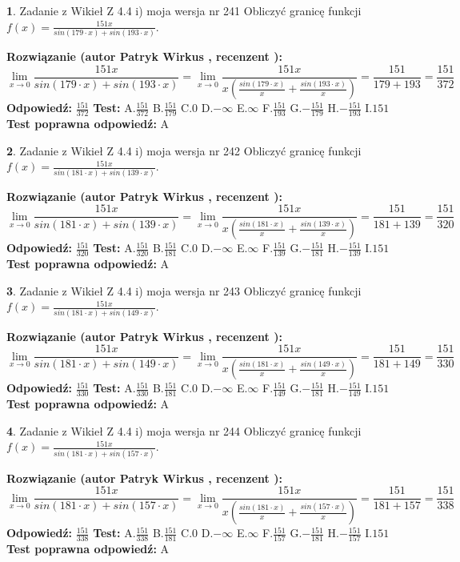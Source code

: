 \documentclass[12pt, a4paper]{article}
\theoremstyle{definition} %
\newtheorem{zad}{}
\newcommand{\zadStart}[1]{\begin{zad}#1\newline}
\newcommand{\zadStop}{\end{zad}}
\newcommand{\rozwStart}[2]{\noindent \textbf{Rozwiązanie (autor #1 , recenzent #2): }\newline}
\newcommand{\rozwStop}{\newline}
\newcommand{\odpStart}{\noindent \textbf{Odpowiedź:}\newline}
\newcommand{\odpStop}{\newline}
\newcommand{\testStart}{\noindent \textbf{Test:}\newline}
\newcommand{\testStop}{\newline}
\newcommand{\kluczStart}{\noindent \textbf{Test poprawna odpowiedź:}\newline}
\newcommand{\kluczStop}{\newline}
\begin{document}
\zadStart{Zadanie z Wikieł Z 4.4 i) moja wersja nr 241}
Obliczyć granicę funkcji $f(x)=\frac{151x}{sin(179\cdot x) +sin(193\cdot x)}$.
\zadStop
\rozwStart{Patryk Wirkus}{}
$$\lim\limits_{x\to 0}\frac{151x}{sin(179\cdot x) +sin(193\cdot x)}=\lim\limits_{x\to 0}\frac{151x}{x(\frac{sin(179\cdot x)}{x}+\frac{sin(193\cdot x)}{x})}=\frac{151}{179+193} = \frac{151}{372}$$
\rozwStop
\odpStart
$\frac{151}{372}$
\odpStop
\testStart
A.$\frac{151}{372}$
B.$\frac{151}{179}$
C.$0$
D.$-\infty$
E.$\infty$
F.$\frac{151}{193}$
G.$-\frac{151}{179}$
H.$-\frac{151}{193}$
I.$151$
\testStop
\kluczStart
A
\kluczStop



\zadStart{Zadanie z Wikieł Z 4.4 i) moja wersja nr 242}
Obliczyć granicę funkcji $f(x)=\frac{151x}{sin(181\cdot x) +sin(139\cdot x)}$.
\zadStop
\rozwStart{Patryk Wirkus}{}
$$\lim\limits_{x\to 0}\frac{151x}{sin(181\cdot x) +sin(139\cdot x)}=\lim\limits_{x\to 0}\frac{151x}{x(\frac{sin(181\cdot x)}{x}+\frac{sin(139\cdot x)}{x})}=\frac{151}{181+139} = \frac{151}{320}$$
\rozwStop
\odpStart
$\frac{151}{320}$
\odpStop
\testStart
A.$\frac{151}{320}$
B.$\frac{151}{181}$
C.$0$
D.$-\infty$
E.$\infty$
F.$\frac{151}{139}$
G.$-\frac{151}{181}$
H.$-\frac{151}{139}$
I.$151$
\testStop
\kluczStart
A
\kluczStop



\zadStart{Zadanie z Wikieł Z 4.4 i) moja wersja nr 243}
Obliczyć granicę funkcji $f(x)=\frac{151x}{sin(181\cdot x) +sin(149\cdot x)}$.
\zadStop
\rozwStart{Patryk Wirkus}{}
$$\lim\limits_{x\to 0}\frac{151x}{sin(181\cdot x) +sin(149\cdot x)}=\lim\limits_{x\to 0}\frac{151x}{x(\frac{sin(181\cdot x)}{x}+\frac{sin(149\cdot x)}{x})}=\frac{151}{181+149} = \frac{151}{330}$$
\rozwStop
\odpStart
$\frac{151}{330}$
\odpStop
\testStart
A.$\frac{151}{330}$
B.$\frac{151}{181}$
C.$0$
D.$-\infty$
E.$\infty$
F.$\frac{151}{149}$
G.$-\frac{151}{181}$
H.$-\frac{151}{149}$
I.$151$
\testStop
\kluczStart
A
\kluczStop



\zadStart{Zadanie z Wikieł Z 4.4 i) moja wersja nr 244}
Obliczyć granicę funkcji $f(x)=\frac{151x}{sin(181\cdot x) +sin(157\cdot x)}$.
\zadStop
\rozwStart{Patryk Wirkus}{}
$$\lim\limits_{x\to 0}\frac{151x}{sin(181\cdot x) +sin(157\cdot x)}=\lim\limits_{x\to 0}\frac{151x}{x(\frac{sin(181\cdot x)}{x}+\frac{sin(157\cdot x)}{x})}=\frac{151}{181+157} = \frac{151}{338}$$
\rozwStop
\odpStart
$\frac{151}{338}$
\odpStop
\testStart
A.$\frac{151}{338}$
B.$\frac{151}{181}$
C.$0$
D.$-\infty$
E.$\infty$
F.$\frac{151}{157}$
G.$-\frac{151}{181}$
H.$-\frac{151}{157}$
I.$151$
\testStop
\kluczStart
A
\kluczStop
\end{document}
